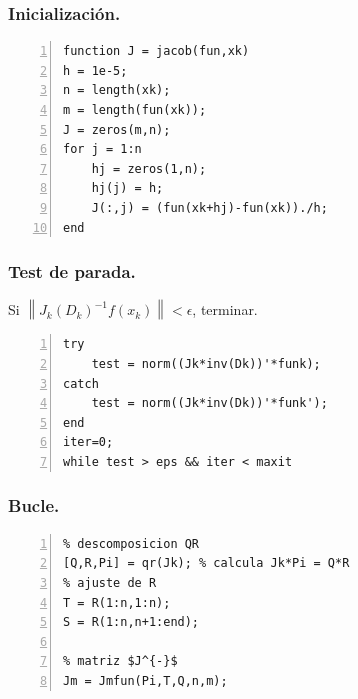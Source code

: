 \documentclass{beamer}
\newcommand{\norm}[1]{\left\lVert#1\right\rVert}
\begin{document}
\begin{frame}[fragile]
    \frametitle{Inicialización.}
\begin{lstlisting}[frame=single, numbers=left, style=Matlab-editor]
function J = jacob(fun,xk)
h = 1e-5;
n = length(xk);
m = length(fun(xk));
J = zeros(m,n);
for j = 1:n
    hj = zeros(1,n);
    hj(j) = h;
    J(:,j) = (fun(xk+hj)-fun(xk))./h;
end
\end{lstlisting}
        
\end{frame}


\begin{frame}[fragile]
    \frametitle{Test de parada.}
\begin{steps}[start=2]
    \item Si $\norm{J_k(D_k)^{-1}f(x_k)} < \epsilon$, terminar.\pause
\end{steps}
\vspace{0.5cm}
\begin{lstlisting}[frame=single, numbers=left, style=Matlab-editor]
try
    test = norm((Jk*inv(Dk))'*funk);
catch
    test = norm((Jk*inv(Dk))'*funk');
end
iter=0;
while test > eps && iter < maxit
\end{lstlisting}
        
\end{frame}

\begin{frame}[fragile]
    \frametitle{Bucle.}
    \begin{lstlisting}[frame=single, numbers=left, style=Matlab-editor]
% solucion problema lineal
% descomposicion QR
[Q,R,Pi] = qr(Jk); % calcula Jk*Pi = Q*R
% ajuste de R
T = R(1:n,1:n);
S = R(1:n,n+1:end);

% matriz $J^{-}$
Jm = Jmfun(Pi,T,Q,n,m);
\end{lstlisting}
\end{frame}
\end{document}
